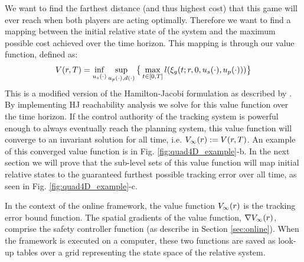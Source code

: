  We want to find the farthest distance (and thus highest cost) that this game will ever reach when both players are acting optimally. Therefore we want to find a mapping between the initial relative state of the system and the maximum possible cost achieved over the time horizon. This mapping is through our value function, defined as:
 \begin{equation}
 \begin{aligned}
 \label{eq:valfunc}
 	V(r,T)= \inf_{u_s(\cdot)} \sup_{u_p(\cdot), d(\cdot)}  \big\{\max_{t\in [0, T]} l(\xi_g(t; r, 0, u_s(\cdot), u_p(\cdot)))\big\}
 	\end{aligned}
 \end{equation} 
 This is a modified version of the Hamilton-Jacobi formulation as described by \cite{Fisac15}. By implementing HJ reachability analysis we solve for this value function over the time horizon. If the control authority of the tracking system is powerful enough to always eventually reach the planning system, this value function will converge to an invariant solution for all time, i.e. $V_\infty(r) := V(r, T)$. An example of this converged value function is in Fig. \ref{fig:quad4D_example}-b. In the next section we will prove that the sub-level sets of this value function will map initial relative states to the guaranteed furthest possible tracking error over all time, as seen in Fig. \ref{fig:quad4D_example}-c.
 
In the context of the online framework, the value function $V_\infty(r)$ is the tracking error bound function. The spatial gradients of the value function, $\nabla V_\infty(r)$, comprise the safety controller function (as describe in Section \ref{sec:online}). When the framework is executed on a computer, these two functions are saved as look-up tables over a grid representing the state space of the relative system.
 
